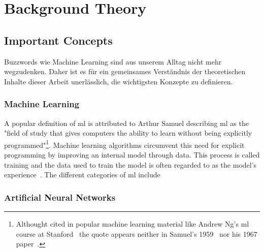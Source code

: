 \documentclass[
			   fontsize=11pt,
               paper=a4,
               bibliography=totoc,
               idxtotoc,
               headsepline,
               footsepline,
               footinclude=false,
               BCOR=12mm,
               DIV=13,
               openany,   %
               ]
               {scrbook}
\begin{document}
\chapter{Background Theory}

\section{Important Concepts}

Buzzwords wie Machine Learning sind aus unserem Alltag nicht mehr wegzudenken. Daher ist es für ein gemeinsames Verständnis der theoretischen Inhalte dieser Arbeit unerlässlich, die wichtigsten Konzepte zu definieren.

\subsection{Machine Learning}

A popular definition of \gls{ml} is attributed to Arthur Samuel describing \gls{ml} as the "field of study that gives computers the ability to learn without being explicitly programmed"\footnote{Althought cited in popular machine learning material like Andrew Ng's \gls{ml} course at Stanford~\cite{mlCourseStan} the quote appears neither in Samuel's 1959~\cite{mlQuote1959} nor his 1967 paper~\cite{mlQuote1967}.}. Machine learning algorithms circumvent this need for explicit programming by improving an internal model through data. This process is called training and the data used to train the model is often regarded to as the model's experience~\cite{mlMitchell}. The different categories of \gls{ml} include 


\subsection{Artificial Neural Networks}
\end{document}
